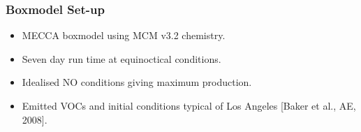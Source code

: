 \begin{frame}
    \frametitle{Boxmodel Set-up}
    \vspace{-4mm}

    \begin{itemize}
        \item MECCA boxmodel using MCM v3.2 chemistry. \vspace{3mm}
        \item Seven day run time at equinoctical conditions. \vspace{3mm}
        \item Idealised NO conditions giving maximum  production. \vspace{3mm}
        \item Emitted VOCs and initial conditions typical of Los Angeles [Baker et al., AE, 2008].
    \end{itemize}
\end{frame}
